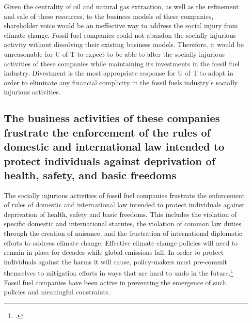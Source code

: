 \documentclass[10pt]{article}
\begin{document}
Given the centrality of oil and natural gas extraction, as well as the refinement and sale of these resources, to the business models of these companies, shareholder voice would be an ineffective way to address the social injury from climate change.
Fossil fuel companies could not abandon the socially injurious activity without dissolving their existing business models.  
Therefore, it would be unreasonable for U of T to expect to be able to alter the socially injurious activities of these companies while maintaining its investments in the fossil fuel industry.  
Divestment is the most appropriate response for U of T to adopt in order to eliminate any financial complicity in the fossil fuels industry’s socially injurious activities.  
  


	\subsection{The business activities of these companies frustrate the enforcement of the rules of domestic and international law intended to protect individuals against deprivation of health, safety, and basic freedoms}
	\label{sec:FrustrateLaw}



The socially injurious activities of fossil fuel companies frustrate the enforcement of rules of domestic and international law intended to protect individuals against deprivation of health, safety and basic freedoms.  
This includes the violation of specific domestic and international statutes, the violation of common law duties through the creation of nuisance, and the frustration of international diplomatic efforts to address climate change.
Effective climate change policies will need to remain in place for decades while global emissions fall.
In order to protect individuals against the harms it will cause, policy-makers must pre-commit themselves to mitigation efforts in ways that are hard to undo in the future.\footcite[In the \emph{Cornell Law Review}, Richard James Lazarus notes that: ``The traditional objection to lawmaking precommitment strategies --- that the present should not be allowed to bind future lawmakers --- also has little force in the climate change context where the purpose of such strategies is not to protect the present at the expense of the future, but the precise opposite: to protect the future at the expense of the present.''][p. 101]{Lazarus2009}
Fossil fuel companies have been active in preventing the emergence of such policies and meaningful constraints.
\end{document}
